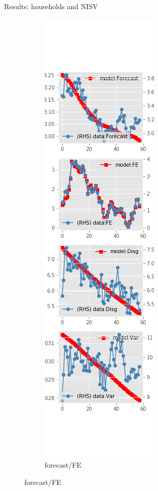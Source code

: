 \documentclass{beamer}
\begin{document}
\begin{frame}{Results: households and NISV}
\begin{figure}[ht]
\begin{subfigure}[b]{0.19\textwidth}
		\end{subfigure}
		\hfill
		\begin{subfigure}[b]{0.19\textwidth}
			\caption{forecast/FE}
			\includegraphics[width=\textwidth, height = 0.8\textheight]{figuresDraft/sce_ni_est_sv_diag2.png}

\end{subfigure}
\end{figure}
\end{frame}
\end{document}
